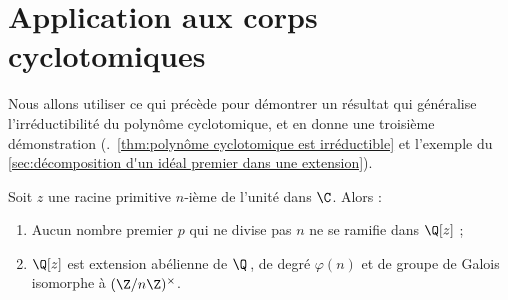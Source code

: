 \documentclass[11pt, useosf,
  title in boldface,
  theorem in new line,
  theorem numbering = section,
  number theorems separately,
]{simplivre}
\begin{document}
\section{Application aux corps cyclotomiques}\label{sec:application aux corps cyclotomiques}

    Nous allons utiliser ce qui précède pour démontrer un résultat qui généralise l'irréductibilité du polynôme cyclotomique, et en donne une troisième démonstration (\cf.~\cref{thm:polynôme cyclotomique est irréductible} et l'exemple du \cref{sec:décomposition d'un idéal premier dans une extension}).

    \begin{theorem}\label{thm:corps cyclotomique}
        Soit \( z \) une racine primitive \( n \)‑ième de l'unité dans \( \C \). Alors :
        \begin{enumerate}
            \item \label{thm:corps cyclotomique;item1} Aucun nombre premier \( p \) qui ne divise pas \( n \) ne se ramifie dans \( \Q[z] \) ;
            \item \label{thm:corps cyclotomique;item2} \( \Q[z] \) est extension abélienne de \( \Q \)\,, de degré \( \varphi(n) \) et de groupe de Galois isomorphe à \( (\Z/n\Z)^\times \).
        \end{enumerate}
    \end{theorem}
\end{document}
